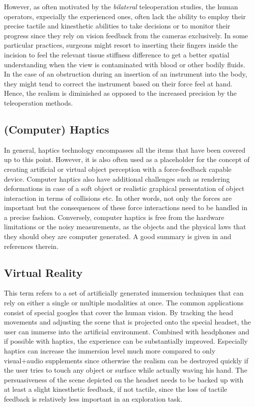 However, as often motivated by the \emph{bilateral} teleoperation studies, the human operators, expecially the experienced ones, often 
lack the ability to employ their precise tactile and kinesthetic abilities to take decisions or to monitor their progress since they rely 
on vision feedback from the cameras exclusively. In some particular practices, surgeons might resort to inserting their fingers inside 
the incision to feel the relevant tissue stiffness difference to get a better spatial understanding when the view is contaminated with 
blood or other bodily fluids. In the case of an obstruction during an insertion of an instrument into the body, they might tend to 
correct the instrument based on their force feel at hand. Hence, the realism is diminished as opposed to the increased precision by the 
teleoperation methods. 

\subsection[Haptics]{(Computer) Haptics}
In general, haptics technology encompasses all the items that have been covered up to this point. However, it is also often used as a 
placeholder for the concept of creating artificial or virtual object perception with a force-feedback capable device. Computer haptics 
also have additional challenges such as rendering deformations in case of a soft object or realistic graphical presentation of object 
interaction in terms of collisions etc. In other words, not only the forces are important but the consequences of these force 
interactions need to be handled in a precise fashion. Conversely, computer haptics is free from the hardware limitations or the noisy 
measurements, as the objects and the physical laws that they should obey are computer generated. A good summary is given in 
\cite{haywardsensor} and references therein. 


\subsection{Virtual Reality}

This term refers to a set of artificially generated immersion techniques that can rely on either a single or multiple modalities at once. 
The common applications consist of special googles that cover the human vision. By tracking the head movements and adjusting the scene 
that is projected onto the special headset, the user can immerse into the artificial environment. Combined with headphones and if possible 
with haptics, the experience can be substantially improved. Especially haptics can increase the immersion level much more compared to 
only visual+audio supplements since otherwise the realism can be destroyed quickly if the user tries to touch any object or surface while 
actually waving his hand. The persuasiveness of the scene depicted on the headset needs to be backed up with at least a slight 
kinesthetic feedback, if not tactile, since the loss of tactile feedback is relatively less important in an exploration task. 
